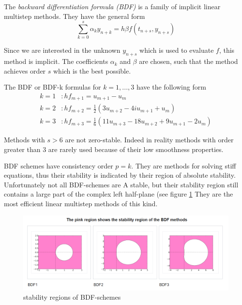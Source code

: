 	The \emph{backward differentiation formula (BDF)} is a family of implicit linear multistep methods. They have the general form
	\begin{equation}
		\sum_{k=0}^{s} \alpha_k y_{n+k} = h \beta f(t_{n+s}, y_{n+s})
	\end{equation}

	Since we are interested in the unknown $y_{n+s}$ which is used to evaluate $f$, this method is implicit. The coefficients $\alpha_k$ and $\beta$ are chosen, such that the method achieves order $s$ which is the best possible.
	
	The BDF or BDF-k formulas for $k=1,...,3$ have the following form %
	\begin{align*}
		k = 1 &: h f_{m+1} = u_{m+1} - u_m \\
		k = 2 &: h f_{m+2} = \frac{1}{2} (3 u_{m+2} - 4 iu_{m+1} + u_m) \\
		k = 3 &: h f_{m+3} = \frac{1}{6} (11 u_{m+3} - 18 u_{m+2} + 9 u_{m+1} - 2 u_m) %
	\end{align*}
	
	Methods with $s > 6$ are not zero-stable. Indeed in reality methods with order greater than 3 are rarely used because of their low smoothness properties.
	
	BDF schemes have consistency order $p = k$. They are methods for solving stiff equations, thus their stability is indicated by their region of absolute stability. Unfortunately not all BDF-schemes are A stable, but their stability region still contains a large part of the complex left half-plane (see figure \ref{fig:screenshot020} They are the most efficient linear multistep methods of this kind.
	
	\begin{figure}[H]
		\centering
		\includegraphics[width=0.7\linewidth]{screenshot020}
		\caption{stability regions of BDF-schemes}
		\label{fig:screenshot020}
	\end{figure}
	
